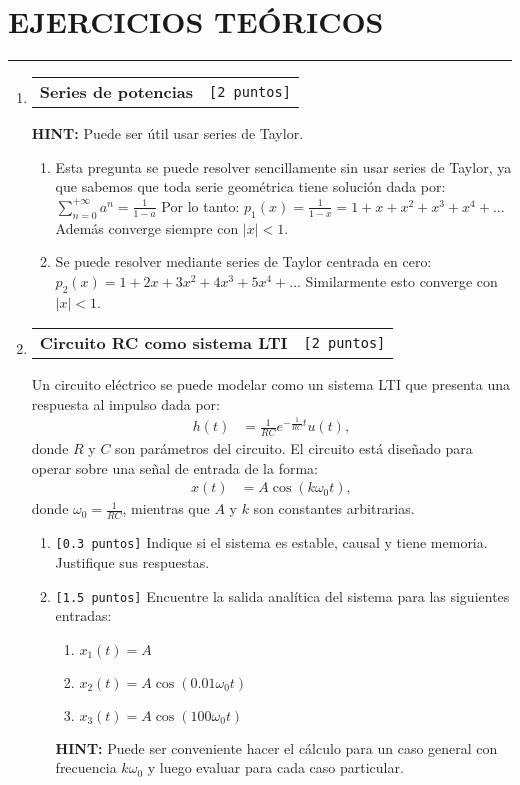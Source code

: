 \documentclass[letterpaper, 12pt]{article}
\makeatletter
\newcommand{\puntos}[1]{\texttt{[#1 puntos]}}
\newenvironment{ejerciciosteoricos}{%
  \clearpage
  \section*{EJERCICIOS TEÓRICOS}
  \hrule
  \vspace{0.5cm}
  \begin{enumerate}[leftmargin=20pt, itemsep=15pt]
}{%
  \end{enumerate}
}
\newenvironment{ejercicio}[2][]{%
  \item
  \noindent\begin{tabularx}{\linewidth}{@{} X r @{}}
    \textbf{#1} & \puntos{#2}
  \end{tabularx}
  
  \begin{tcolorbox}[
    enhanced,
    breakable,
    colback=white,
    colframe=pucgray,
    boxrule=1pt,
    rounded corners=5pt,
    left=10pt,
    right=10pt,
    top=8pt,
    bottom=8pt
  ]
}{%
  \end{tcolorbox}
  \vspace{0.5cm}
}
\newcommand{\hint}[1]{%
  \begin{tcolorbox}[
    colback=black!5,
    colframe=black!60,
    boxrule=1pt,
    rounded corners=3pt,
    left=8pt,
    right=8pt,
    top=5pt,
    bottom=5pt
  ]
  \textbf{HINT:} #1
  \end{tcolorbox}
}
\newif\ifanswers
\newenvironment{solucion}{%
  \ifanswers
    \begin{tcolorbox}[
      enhanced,
      breakable,
      colback=black!5,
      colframe=black!50,
      boxrule=1pt,
      rounded corners=5pt,
      left=8pt,
      right=8pt,
      top=8pt,
      bottom=8pt,
      title={\textbf{SOLUCIÓN}},
      fonttitle=\bfseries
    ]
  \fi
}{%
  \ifanswers
    \end{tcolorbox}
  \fi
}
\makeatother
\begin{document}
\begin{ejerciciosteoricos}
\begin{ejercicio}[Series de potencias]{2}
  \hint{Puede ser útil usar series de Taylor.}
  
  \begin{solucion}
    \begin{enumerate}
      \item Esta pregunta se puede resolver sencillamente sin usar series de Taylor, ya que sabemos que toda serie geométrica tiene solución dada por:
      $\sum_{n = 0}^{+\infty}a^n=\frac{1}{1-a}$
      Por lo tanto:
      $p_1(x) = \frac{1}{1-x} = 1+x+x^2+x^3+x^4+...$
      Además converge siempre con $|x|<1$.
      
      \item Se puede resolver mediante series de Taylor centrada en cero:
      $p_2(x) = 1 + 2x + 3x^2+ 4x^3+5x^4+...$
      Similarmente esto converge con $|x| <1$.
    \end{enumerate}
  \end{solucion}
\end{ejercicio}

\begin{ejercicio}[Circuito RC como sistema LTI]{2}
  Un circuito eléctrico se puede modelar como un sistema LTI que presenta una respuesta al impulso dada por:
  \begin{align*}
      h(t) &= \frac{1}{RC} e^{-\frac{1}{RC}t}u(t),
  \end{align*}
  donde $R$ y $C$ son parámetros del circuito. El circuito está diseñado para operar sobre una señal de entrada de la forma:
  \begin{align*}
      x(t) &= A\cos(k\omega_0 t),
  \end{align*}
  donde $\omega_0 = \frac{1}{RC}$, mientras que $A$ y $k$ son constantes arbitrarias.
  
  \begin{enumerate}
    \item \puntos{0.3} Indique si el sistema es estable, causal y tiene memoria. Justifique sus respuestas.
    
    \item \puntos{1.5} Encuentre la salida analítica del sistema para las siguientes entradas:
    \begin{enumerate}
      \item $x_1(t) = A$
      \item $x_2(t) = A\cos(0.01\omega_0 t)$
      \item $x_3(t) = A\cos(100\omega_0 t)$
    \end{enumerate}
    
    \hint{Puede ser conveniente hacer el cálculo para un caso general con frecuencia $k \omega_0$ y luego evaluar para cada caso particular.}
    

\end{enumerate}
\end{ejercicio}
\end{ejerciciosteoricos}
\end{document}
